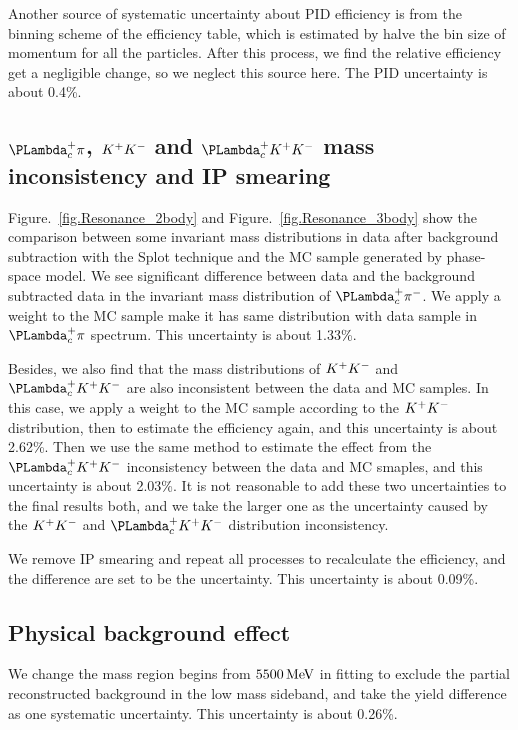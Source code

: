 Another source of systematic uncertainty about PID efficiency is from the binning scheme of the efficiency table, 
which is estimated by halve the bin size of momentum for all the particles. 
After this process, 
we find the relative efficiency get a negligible change, so we neglect this source here.
The PID uncertainty is about 0.4\%.

\subsection{$\Lc\pi$, ${{K}^+}{{K}^-}$ and $\Lc\Kp\Km$ mass inconsistency and \Lb IP smearing}
\label{sec:sys_resonance}

Figure.~\ref{fig.Resonance_2body} and Figure.~\ref{fig.Resonance_3body} show the comparison between some invariant mass distributions 
in data after background subtraction with the Splot technique and the MC sample generated by phase-space model. 
We see significant difference between data and the background subtracted data in the invariant mass distribution of $\Lc\pi^-$. 
We apply a weight to the MC sample make it has same distribution with data sample in $\Lc\pi$ spectrum. 
This uncertainty is about 1.33\%.

Besides, 
we also find that the mass distributions of ${{K}^+}{{K}^-}$ and $\Lc\Kp\Km$ are also inconsistent between the data and MC samples.
In this case, 
we apply a weight to the MC sample according to the ${{K}^+}{{K}^-}$ distribution, 
then to estimate the efficiency again, and this uncertainty is about 2.62\%.
Then we use the same method to estimate the effect from the $\Lc\Kp\Km$ inconsistency between the data and MC smaples, 
and this uncertainty is about 2.03\%.
It is not reasonable to add these two uncertainties to the final results both, 
and we take the larger one as the uncertainty caused by the ${{K}^+}{{K}^-}$ and $\Lc\Kp\Km$ distribution inconsistency.

We remove \Lb IP smearing and repeat all processes to recalculate the efficiency, 
and the difference are set to be the uncertainty. This uncertainty is about 0.09\%.



\subsection{Physical background effect }
\label{sec:sys_physical}
We change the mass region begins from $5500 \text{\,Me\kern -0.1em V}$ in \LbLckkpi fitting to exclude the partial reconstructed background in the low mass sideband, 
and take the yield difference as one systematic uncertainty. 
This uncertainty is about 0.26\%.

